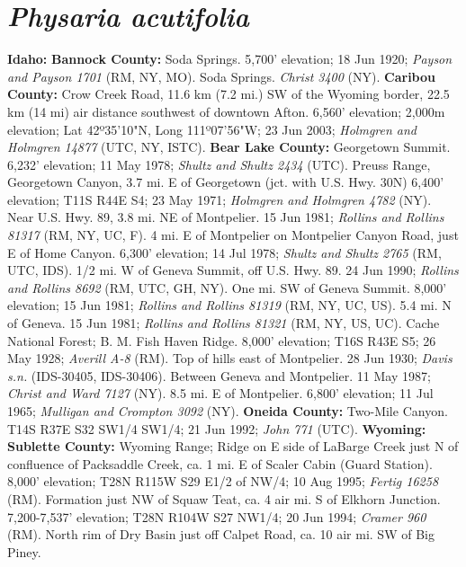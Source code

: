 \section*{\textit{Physaria acutifolia}}

  \textbf{Idaho:}
  \textbf{Bannock County:}
Soda Springs. 5,700' elevation; 18 Jun 1920;
\textit{Payson and Payson 1701} (RM, NY, MO).
Soda Springs. \textit{Christ 3400} (NY).
  \textbf{Caribou County:}
Crow Creek Road, 11.6 km (7.2 mi.) SW of the Wyoming border, 22.5 km (14 mi)
air distance southwest of downtown Afton. 6,560' elevation; 2,000m elevation;
Lat 42º35'10"N, Long 111º07'56"W; 23 Jun 2003;
\textit{Holmgren and Holmgren 14877} (UTC, NY, ISTC).
  \textbf{Bear Lake County:}
Georgetown Summit. 6,232' elevation; 11 May 1978;
\textit{Shultz and Shultz 2434} (UTC).
Preuss Range, Georgetown Canyon, 3.7 mi. E of Georgetown
(jct. with U.S. Hwy. 30N) 6,400' elevation; T11S R44E S4; 23 May 1971;
\textit{Holmgren and Holmgren 4782} (NY).
Near U.S. Hwy. 89, 3.8 mi. NE of Montpelier. 15 Jun 1981;
\textit{Rollins and Rollins 81317} (RM, NY, UC, F).
4 mi. E of Montpelier on Montpelier Canyon Road, just E of Home Canyon.
6,300' elevation; 14 Jul 1978; \textit{Shultz and Shultz 2765} (RM, UTC, IDS).
1/2 mi. W of Geneva Summit, off U.S. Hwy. 89. 24 Jun 1990;
\textit{Rollins and Rollins 8692} (RM, UTC, GH, NY).
One mi. SW of Geneva Summit. 8,000' elevation; 15 Jun 1981;
\textit{Rollins and Rollins 81319} (RM, NY, UC, US).
5.4 mi. N of Geneva. 15 Jun 1981;
\textit{Rollins and Rollins 81321} (RM, NY, US, UC).
Cache National Forest; B. M. Fish Haven Ridge. 8,000' elevation; T16S R43E S5;
26 May 1928; \textit{Averill A-8} (RM).
Top of hills east of Montpelier. 28 Jun 1930;
\textit{Davis s.n.} (IDS-30405, IDS-30406).
Between Geneva and Montpelier. 11 May 1987; \textit{Christ and Ward 7127} (NY).
8.5 mi. E of Montpelier. 6,800' elevation; 11 Jul 1965;
\textit{Mulligan and Crompton 3092} (NY).
  \textbf{Oneida County:}
Two-Mile Canyon. T14S R37E S32 SW1/4 SW1/4; 21 Jun 1992;
\textit{John 771} (UTC).
  \textbf{Wyoming: }
  \textbf{Sublette County:}
Wyoming Range; Ridge on E side of LaBarge Creek just N of confluence of
Packsaddle Creek, ca. 1 mi. E of Scaler Cabin (Guard Station).
8,000’ elevation; T28N R115W S29 E1/2 of NW/4; 10 Aug 1995;
\textit{Fertig 16258} (RM).
Formation just NW of Squaw Teat, ca. 4 air mi. S of Elkhorn Junction.
7,200-7,537' elevation; T28N R104W S27 NW1/4; 20 Jun 1994;
\textit{Cramer 960} (RM).
North rim of Dry Basin just off Calpet Road, ca. 10 air mi. SW of Big Piney.
